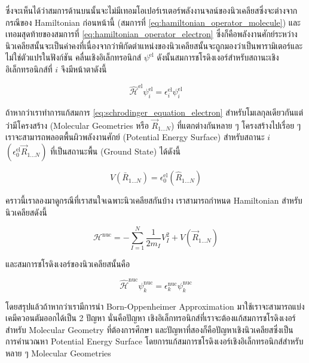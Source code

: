 \noindent ซึ่งจะเห็นได้ว่าสมการด้านบนนั้นจะไม่มีเทอมโอเปอร์เรเตอร์พลังงานจลน์ของนิวเคลียสซึ่งจะต่างจากกรณีของ Hamiltonian ก่อนหน้านี้
(สมการที่ \eqref{eq:hamiltonian_operator_molecule}) และเทอมสุดท้ายของสมการที่ \eqref{eq:hamiltonian_operator_electron}
ซึ่งก็คือพลังงานศักย์ระหว่างนิวเคลียสนั้นจะเป็นค่าคงที่เนื่องจากว่าพิกัดตำแหน่งของนิวเคลียสนั้นจะถูกมองว่าเป็นพารามิเตอร์และไม่ใช่ตัวแปรในฟังก์ชัน%
คลื่นเชิงอิเล็กทรอนิกส์ $\psi^{\text{el}}$ ดังนั้นสมการชโรดิงเงอร์สำหรับสถานะเชิงอิเล็กทรอนิกส์ที่ $i$ จึงมีหน้าตาดังนี้

\begin{equation}
    \label{eq:schrodinger_equation_electron}
    \hat{\mathscr{H}}^{\text{el}} \psi^{\text{el}}_{i}
    =
    \epsilon^{\text{el}}_{i} \psi^{\text{el}}_{i}
\end{equation}

ถ้าหากว่าเราทำการแก้สมการ \eqref{eq:schrodinger_equation_electron} สำหรับโมเลกุลเดียวกันแต่ว่ามีโครงสร้าง (Molecular Geometries
หรือ $\vec{R}_{1 \dots N}$) ที่แตกต่างกันหลาย ๆ โครงสร้างไปเรื่อย ๆ เราจะสามารถพลอตพื้นผิวพลังงานศักย์ (Potential Energy Surface)
สำหรับสถานะ $i$ $(\epsilon^{\text{el}}_{0} \vec{R}_{1 \dots N})$ ที่เป็นสถานะพื้น (Ground State) ได้ดังนี้

\begin{equation}
    V\left(\bar{R}_{1 \dots N}\right)
    =
    \epsilon_{0}^{\mathrm{el}}\left(\hat{R}_{1 \dots N}\right)
\end{equation}

คราวนี้เราลองมาดูกรณีที่เราสนใจเฉพาะนิวเคลียสกันบ้าง เราสามารถกำหนด Hamiltonian สำหรับนิวเคลียสดังนี้

\begin{equation}
    \label{eq:hamiltonian_operator_nuclei}
    \mathcal{H}^{\text{nuc}}
    =
    - \sum_{I=1}^{N} \frac{1}{2 m_{I}} V_{I}^{2}
    + V\left(\vec{R}_{1 \dots N}\right)
\end{equation}

\noindent และสมการชโรดิงเงอร์ของนิวเคลียสนั้นคือ

\begin{equation}
    \label{eq:schrodinger_equation_nuclei}
    \hat{\mathscr{H}}^{\text{nuc}} \psi^{\text{nuc}}_{k}
    =
    \epsilon^{\text{nuc}}_{k} \psi^{\text{nuc}}_{k}
\end{equation}

โดยสรุปแล้วถ้าหากว่าเรามีการนำ Born-Oppenheimer Approximation มาใช้เราจะสามารถแบ่งเคมีควอนตัมออกได้เป็น 2 ปัญหา นั่นคือปัญหา%
เชิงอิเล็กทรอนิกส์ที่เราจะต้องแก้สมการชโรดิงเงอร์สำหรับ Molecular Geometry ที่ต้องการศึกษา และปัญหาที่สองก็คือปัญหาเชิงนิวเคลียสซึ่งเป็น%
การคำนวณหา Potential Energy Surface โดยการแก้สมการชโรดิงเงอร์เชิงอิเล็กทรอนิกส์สำหรับหลาย ๆ Molecular Geometries

